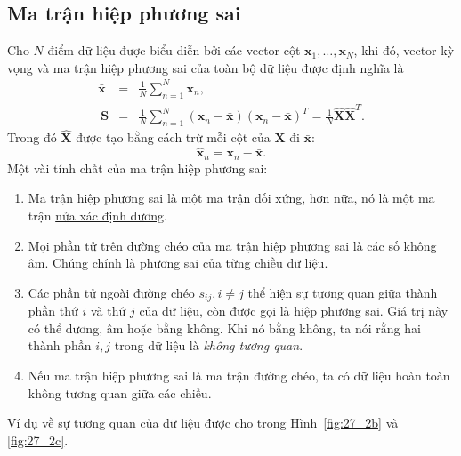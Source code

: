 \subsection{Ma trận hiệp phương sai}

Cho $N$ điểm dữ liệu được biểu diễn bởi các vector cột $\mathbf{x}_1, \dots, \mathbf{x}_N$, khi đó, {vector kỳ vọng} và {ma trận hiệp phương sai} của toàn bộ dữ liệu được định nghĩa là
\begin{eqnarray}
\bar{\mathbf{x}} &=& \frac{1}{N} \sum_{n=1}^N \mathbf{x}_n, \\\
\mathbf{S} &=&  \frac{1}{N}\sum_{n=1}^N (\mathbf{x}_n - \bar{\mathbf{x}})(\mathbf{x}_n - \bar{\mathbf{x}})^T = \frac{1}{N}\hat{\mathbf{X}}\hat{\mathbf{X}}^T.
\end{eqnarray}
Trong đó $\hat{\mathbf{X}}$ được tạo bằng cách trừ mỗi cột của $\mathbf{X}$ đi $\bar{\mathbf{x}}$:
\begin{equation}
\hat{\mathbf{x}}_n = \mathbf{x}_n - \bar{\mathbf{x}}.
\end{equation}
\newpage
Một vài tính chất của ma trận hiệp phương sai:
\begin{enumerate}

\item Ma trận hiệp phương sai là một ma trận đối xứng, hơn nữa, nó là một ma trận \href{https://machinelearningcoban.com/2017/03/12/convexity/#positive-semidefinite}{nửa xác định dương}.

\item Mọi phần tử trên đường chéo của ma trận hiệp phương sai là các số không âm. Chúng chính là phương sai của từng chiều dữ liệu.

\item Các phần tử ngoài đường chéo $s_{ij}, i \neq j$ thể hiện sự tương quan
giữa thành phần thứ $i$ và thứ $j$ của dữ liệu, còn được gọi là hiệp phương
sai. Giá trị này có thể dương, âm hoặc bằng không. Khi nó bằng không, ta nói
rằng hai thành phần $i, j$ trong dữ liệu là \textit{không tương quan}.

\item Nếu ma trận hiệp phương sai là ma trận đường chéo, ta có dữ liệu hoàn toàn không tương quan giữa các chiều.
\end{enumerate}

Ví dụ về sự tương quan của dữ liệu được cho trong Hình~\ref{fig:27_2b} và
\ref{fig:27_2c}.%

